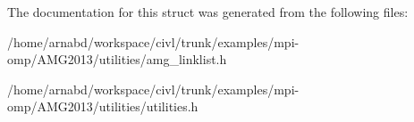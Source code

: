 The documentation for this struct was generated from the following files\+:\begin{DoxyCompactItemize}
\item 
/home/arnabd/workspace/civl/trunk/examples/mpi-\/omp/\+A\+M\+G2013/utilities/amg\+\_\+linklist.\+h\item 
/home/arnabd/workspace/civl/trunk/examples/mpi-\/omp/\+A\+M\+G2013/utilities/utilities.\+h\end{DoxyCompactItemize}
